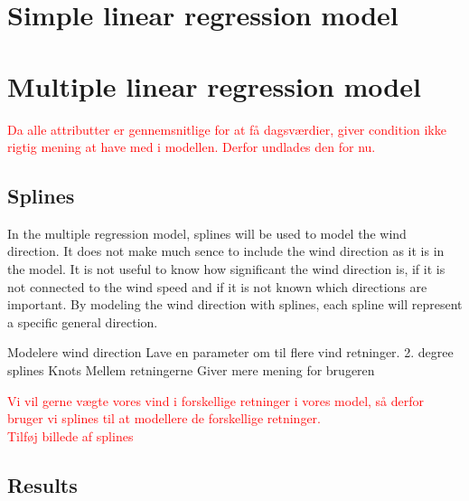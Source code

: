 \section{Simple linear regression model}

\section{Multiple linear regression model}
\textcolor{red}{Da alle attributter er gennemsnitlige for at få dagsværdier, giver condition ikke rigtig mening at have med i modellen. Derfor undlades den for nu.}

\subsection{Splines}
In the multiple regression model, splines will be used to model the wind direction. It does not make much sence to include the wind direction as it is in the model. It is not useful to know how significant the wind direction is, if it is not connected to the wind speed and if it is not known which directions are important. By modeling the wind direction with splines, each spline will represent a specific general direction.


Modelere wind direction
Lave en parameter om til flere vind retninger.
2. degree splines
Knots
Mellem retningerne
Giver mere mening for brugeren

\textcolor{red}{Vi vil gerne vægte vores vind i forskellige retninger i vores model, så derfor bruger vi splines til at modellere de forskellige retninger.} \\

\textcolor{red}{Tilføj billede af splines}

\subsection{Results}